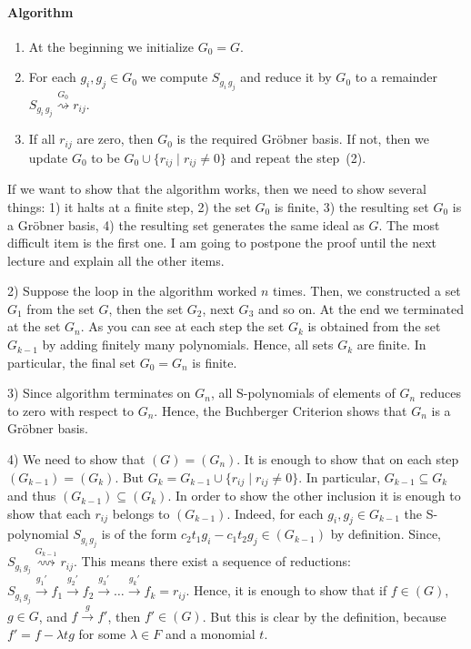 \paragraph{Algorithm}

\begin{enumerate}
\item At the beginning we initialize $G_0 = G$.

\item For each $g_i,g_j\in G_0$ we compute $S_{g_i\,g_j}$ and reduce it by $G_0$ to a remainder $S_{g_i\,g_j}\stackrel{G_0}{\rightsquigarrow}r_{ij}$.

\item If all $r_{ij}$ are zero, then $G_0$ is the required Gr\"obner basis.
If not, then we update $G_0$ to be $G_0\cup \{r_{ij}\mid r_{ij} \neq 0\}$ and repeat the step~(2).
\end{enumerate}

If we want to show that the algorithm works, then we need to show several things: 1) it halts at a finite step, 2) the set $G_0$ is finite, 3) the resulting set $G_0$ is a Gr\"obner basis, 4) the resulting set generates the same ideal as $G$.
The most difficult item is the first one.
I am going to postpone the proof until the next lecture and explain all the other items.

2) Suppose the loop in the algorithm worked $n$ times.
Then, we constructed a set $G_1$ from the set $G$, then the set $G_2$, next $G_3$ and so on.
At the end we terminated at the set $G_n$.
As you can see at each step the set $G_k$ is obtained from the set $G_{k-1}$ by adding finitely many polynomials.
Hence, all sets $G_k$ are finite.
In particular, the final set $G_0 = G_n$ is finite.

3) Since algorithm terminates on $G_n$, all S-polynomials of elements of $G_n$ reduces to zero with respect to $G_n$.
Hence, the Buchberger Criterion shows that $G_n$ is a Gr\"obner basis.

4) We need to show that $(G) = (G_n)$.
It is enough to show that on each step $(G_{k-1}) = (G_k)$.
But $G_k = G_{k-1} \cup \{r_{ij}\mid r_{ij}\neq 0\}$.
In particular, $G_{k-1}\subseteq G_k$ and thus $(G_{k-1}) \subseteq (G_k)$.
In order to show the other inclusion it is enough to show that each $r_{ij}$ belongs to $(G_{k-1})$.
Indeed, for each $g_i,g_j\in G_{k-1}$ the S-polynomial $S_{g_i\,g_j}$ is of the form $c_2t_1 g_i - c_1 t_2 g_j\in (G_{k-1})$ by definition.
Since, $S_{g_i\,g_j}\stackrel{G_{k-1}}{\rightsquigarrow}r_{ij}$.
This means there exist a sequence of reductions: $S_{g_i\,g_j}\stackrel{g_1'}{\longrightarrow}f_1\stackrel{g_2'}{\longrightarrow}f_2\stackrel{g_3'}{\longrightarrow}\ldots\stackrel{g_k'}{\longrightarrow}f_k = r_{ij}$.
Hence, it is enough to show that if $f\in (G)$, $g\in G$, and $f\stackrel{g}{\longrightarrow}f'$, then $f'\in (G)$.
But this is clear by the definition, because $f' = f - \lambda t g$ for some $\lambda \in F$ and a monomial $t$.

